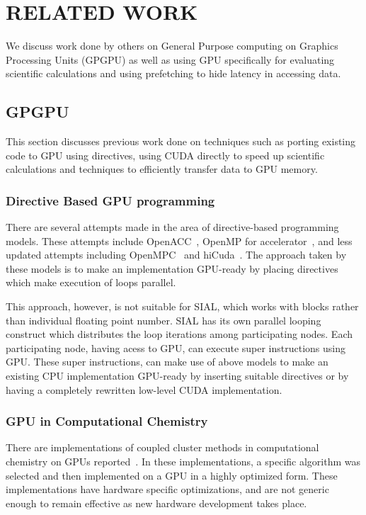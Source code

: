 \chapter{RELATED WORK}\label{lit}
We discuss work done by others on General Purpose computing on Graphics Processing
Units (GPGPU) as well as using GPU specifically for evaluating scientific calculations
and using prefetching to hide latency in accessing data.

\section{GPGPU}
This section discusses previous work done on techniques such as porting existing
code to GPU using directives, using CUDA directly to speed up scientific calculations and
techniques to efficiently transfer data to GPU memory.

\subsection{Directive Based GPU programming}
There are several attempts made in the area of directive-based programming models. These
attempts include OpenACC~\cite{openacc}, OpenMP for
accelerator~\cite{openmpforaccelerators}, and less updated attempts including
OpenMPC~\cite{openmpc} and hiCuda~\cite{hicuda}. The approach taken by these models
is to make an implementation GPU-ready by placing directives which make
execution of loops parallel.

This approach, however, is not suitable for SIAL, which works with blocks rather
than individual floating point number. SIAL has its own parallel looping construct which
distributes the loop iterations among participating nodes. Each participating node,
having acess to GPU, can execute super instructions using GPU. These super instructions,
can make use of above models to make an existing CPU implementation
GPU-ready by inserting suitable directives or by having a completely rewritten low-level
CUDA implementation.

\subsection{GPU in Computational Chemistry}
There are implementations of coupled cluster methods in computational chemistry
on GPUs reported~\cite{bhaskar2013}\cite{deprince2011}\cite{maw2011}. In these
implementations, a specific algorithm was selected and then implemented on a
GPU in a highly optimized form. These implementations have hardware specific
optimizations, and are not generic enough to remain effective as new hardware
development takes place.

